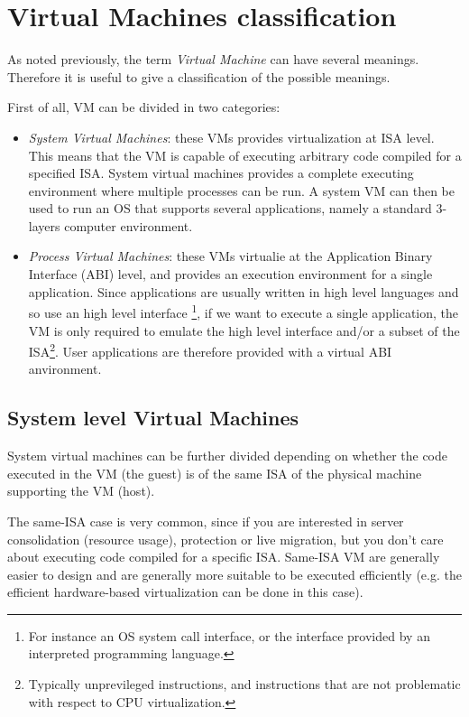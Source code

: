 \section{Virtual Machines classification}
\label{sec:vmclass}

As noted previously, the term \emph{Virtual Machine} can have several meanings. Therefore it is useful to give
a classification of the possible meanings.

First of all, VM can be divided in two categories:
\begin{itemize}
    \item \emph{System Virtual Machines}: these VMs provides virtualization at ISA level. This means that the VM is capable of executing 
	  arbitrary code compiled for a specified ISA.  System virtual machines provides a complete executing environment where
	  multiple processes can be run.
	  A system VM can then be used to run an OS that supports several applications, namely a standard 3-layers computer
	  environment.
	  
    \item \emph{Process Virtual Machines}: these VMs virtualie at the Application Binary Interface (ABI) level, and provides
	  an execution environment for a single application. Since
	  applications are usually written in high level languages and so use an high level interface \footnote{For instance an OS 
	  system call interface, or the interface provided by an interpreted programming language.}, if we want to execute a single
	  application, the VM is only required to emulate the high level interface and/or a subset of the ISA\footnote{Typically 
	  unprevileged instructions, and instructions that are not problematic with respect to CPU virtualization.}. User 
	  applications are therefore provided with a virtual ABI anvironment.
\end{itemize}

\subsection{System level Virtual Machines}
System virtual machines can be further divided depending on whether the code executed in the VM (the guest) is of the same ISA
of the physical machine supporting the VM (host).

The same-ISA case is very common, since if you are interested in server consolidation (resource usage), protection or live 
migration, but you don't care about executing code compiled for a specific ISA. Same-ISA VM are generally easier to design and 
are generally more suitable to be executed efficiently (e.g. the efficient hardware-based virtualization can be done in this case).

